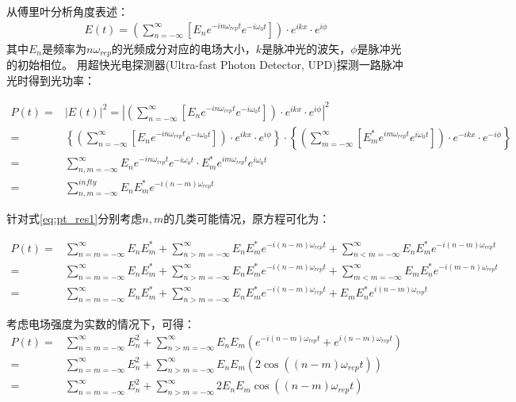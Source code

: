 从傅里叶分析角度表述：
\begin{align}
    E(t)=\left(\sum_{n=-\infty}^{\infty}\left[E_n e^{-in\omega_{rep}t} e^{-i\omega_0 t} \right]\right)\cdot e^{ikx}\cdot e^{i\phi}
\end{align}
其中$E_n$是频率为$n\omega_{rep}$的光频成分对应的电场大小，$k$是脉冲光的波矢，$\phi$是脉冲光的初始相位。
用超快光电探测器(Ultra-fast Photon Detector, UPD)探测一路脉冲光时得到光功率：
\begin{footnotesize}
\begin{align}
    P(t)=&|E(t)|^2=\left|\left(\sum_{n=-\infty}^{\infty}\left[E_n e^{-in\omega_{rep}t} e^{-i\omega_0 t} \right]\right)\cdot e^{ikx}\cdot e^{i\phi}\right|^2\\
    =&\left\{\left(\sum_{n=-\infty}^{\infty}\left[E_n e^{-in\omega_{rep}t} e^{-iω_0 t} \right]\right)\cdot e^{ikx}\cdot e^{i\phi}\right\} \cdot\left\{\left(\sum_{m=-\infty}^{\infty}\left[E^*_m e^{im\omega_{rep}t} e^{i\omega_0 t} \right]\right)\cdot e^{-ikx}\cdot e^{-i\phi}\right\}\\
    =&\sum_{n,m=-\infty}^{\infty}E_n e^{-in\omega_{rep} t} e^{-i\omega_0 t}\cdot E_m^* e^{im\omega_{rep} t} e^{i\omega_0 t}\\
    =&\sum_{n,m=-\infty}^{infty}E_n E_m^* e^{-i(n-m) \omega_{rep} t}\label{eq:pt_res1}
\end{align}    
\end{footnotesize}

针对式\eqref{eq:pt_res1}分别考虑$n,m$的几类可能情况，原方程可化为：
\begin{footnotesize}
\begin{align}
    P(t)=&\sum_{n=m=-\infty}^{\infty}E_n E_m^*
    +\sum_{n>m=-\infty}^{\infty}E_n E_m^*e^{-i(n-m)\omega_{rep}t}+\sum_{n<m=-\infty}^{\infty}E_n E_m^*e^{-i(n-m)\omega_{rep}t}\\
    =&\sum_{n=m=-\infty}^{\infty}E_n E_m^*
    +\sum_{n>m=-\infty}^{\infty}E_n E_m^*e^{-i(n-m)\omega_{rep}t}+\sum_{m<m=-\infty}^{\infty}E_m E_n^*e^{-i(m-n)\omega_{rep}t}\\
    =&\sum_{n=m=-\infty}^{\infty}E_n E_m^*+\sum_{n>m=-\infty}^{\infty}E_n E_m^*e^{-i(n-m)\omega_{rep}t}+E_mE_n^* e^{i(n-m)\omega_{rep}t}
\end{align}
\end{footnotesize}

考虑电场强度为实数的情况下，可得：
\begin{align}
    P(t)=&\sum_{n=m=-\infty}^{\infty}E_n^2 + \sum_{n>m=-\infty}^{\infty}E_n E_m\left(e^{-i(n-m)\omega_{rep}t}+e^{i(n-m)\omega_{rep}t}\right)\\
    =&\sum_{n=m=-\infty}^{\infty}E_n^2 + \sum_{n>m=-\infty}^{\infty}E_n E_m\left(2\cos\left((n-m)\omega_{rep}t\right)\right)\\
    =&\sum_{n=m=-\infty}^{\infty}E_n^2 + \sum_{n>m=-\infty}^{\infty}2E_n E_m \cos\left((n-m)\omega_{rep}t\right)\label{eq:pt_res2}
\end{align}

